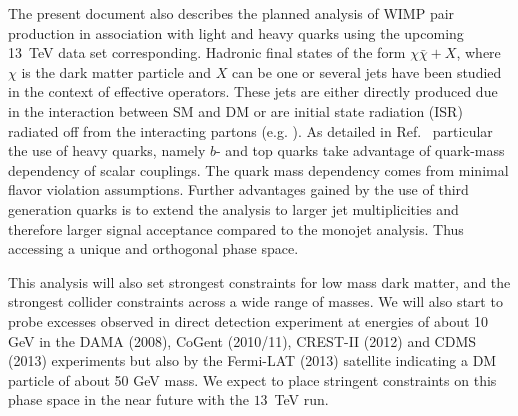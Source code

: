 

The present document also describes the planned analysis of WIMP pair production in association with light and heavy quarks using the upcoming 13~TeV data set corresponding. 
Hadronic final states of the form $\chi \bar \chi + X$, where $\chi$ is the dark matter particle and $X$ can be one or several jets have been studied in the context of effective operators. These jets are either directly produced due in the interaction between SM and DM or are initial state radiation (ISR)  radiated off from the interacting partons (e.g. \cite{Goodman:2010yf,Fox:2011pm,Petriello:2008pu,Fox:2011fx}). As detailed in Ref.~\cite{Lin:2013sca, Artoni:2013zba} particular the use of heavy quarks, namely $b$- and top quarks take advantage of quark-mass dependency of scalar couplings. The quark mass dependency comes from minimal flavor violation assumptions. Further advantages gained by the use of third generation quarks is to extend the analysis to larger jet multiplicities and therefore larger signal acceptance compared to the monojet analysis. Thus accessing a unique and orthogonal phase space. 


This analysis will also set strongest constraints for low mass dark matter, and the strongest collider constraints across a wide range of masses. We will also start to probe excesses observed in direct detection experiment at energies of about 10 GeV in the DAMA (2008), CoGent (2010/11), CREST-II (2012) and CDMS (2013) experiments but also by the Fermi-LAT (2013) satellite indicating a DM particle of about 50 GeV mass. We expect to place stringent constraints on this phase space in the near future with the $13$~TeV run.
